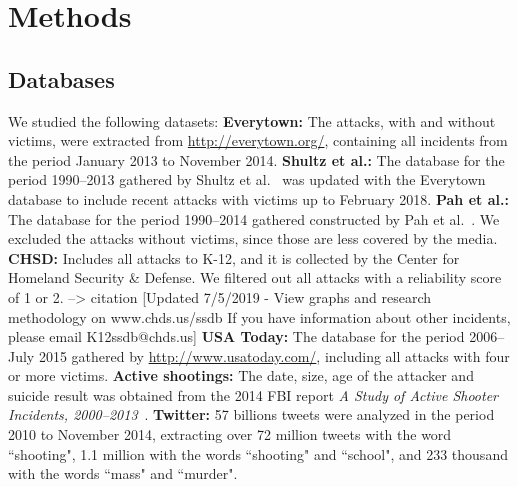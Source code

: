 \section*{Methods}

\subsection*{Databases}
We studied the following datasets:
\textbf{Everytown:} The attacks, with and without victims, were extracted from \url{http://everytown.org/}, containing all incidents from the period January 2013 to November 2014.
\textbf{Shultz et al.:} The database for the period 1990--2013 gathered by Shultz et al.~\cite{Shultz2013} was updated with the Everytown database to include recent attacks with victims up to February 2018.
\textbf{Pah et al.:} The database for the period 1990--2014 gathered constructed by Pah et al.~\cite{Pah2018}. We excluded the attacks without victims, since those are less covered by the media.
\textbf{CHSD:} Includes all attacks to K-12, and it is collected by the Center for Homeland Security & Defense. We filtered out all attacks with a reliability score of 1 or 2. --> citation [Updated 7/5/2019 - View graphs and research methodology on www.chds.us/ssdb If you have information about other incidents, please email K12ssdb@chds.us]
\textbf{USA Today:} The database for the period 2006--July 2015 gathered by \url{http://www.usatoday.com/},  including all attacks with four or more victims.
\textbf{Active shootings:} The date, size, age of the attacker and suicide result was obtained from the 2014 FBI report \textit{A Study of Active Shooter Incidents, 2000--2013}~\cite{FBI}.
\textbf{Twitter:} 57 billions tweets were analyzed in the period 2010 to November 2014, extracting over 72 million tweets with the word ``shooting", 1.1 million with the words ``shooting" and ``school", and 233 thousand with the words ``mass" and ``murder". 
 
